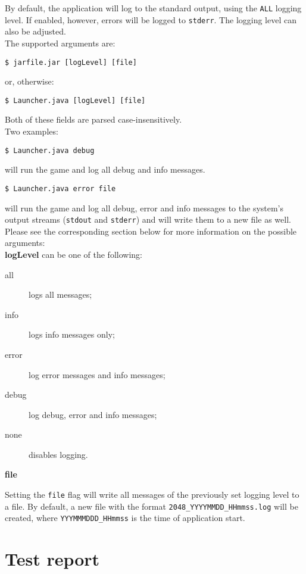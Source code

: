 \documentclass[a4paper,11pt,report]{scrartcl}
\begin{document}
By default, the application will log to the standard output, using the
\texttt{ALL} logging level. If enabled, however, errors will be logged to
\texttt{stderr}. The logging level can also be adjusted.\\

The supported arguments are:
\begin{verbatim}
$ jarfile.jar [logLevel] [file]
\end{verbatim}
or, otherwise:
\begin{verbatim}
$ Launcher.java [logLevel] [file]
\end{verbatim}
Both of these fields are parsed case-insensitively.\\

Two examples:
\begin{verbatim}
$ Launcher.java debug
\end{verbatim}
will run the game and log all debug and info messages. 
\begin{verbatim}
$ Launcher.java error file
\end{verbatim}
will run the game and log all debug, error and info messages to the system's
output streams (\texttt{stdout} and \texttt{stderr}) and will write them to a
new file as well.\\

Please see the corresponding section below for more information on the possible
arguments:\\

\textbf{logLevel} can be one of the following:
\begin{description}
	\item[all] logs all messages;
	\item[info] logs info messages only;
	\item[error] log error messages and info messages;
	\item[debug] log debug, error and info messages;
	\item[none] disables logging.
\end{description}

\textbf{file}

Setting the \texttt{file} flag will write all messages of the previously set
logging level to a file. By default, a new file with the format
\texttt{2048\_YYYYMMDD\_HHmmss.log} will be created, where
\texttt{YYYMMMDDD\_HHmmss} is the time of application start.

\newpage\section{Test report}
\end{document}
